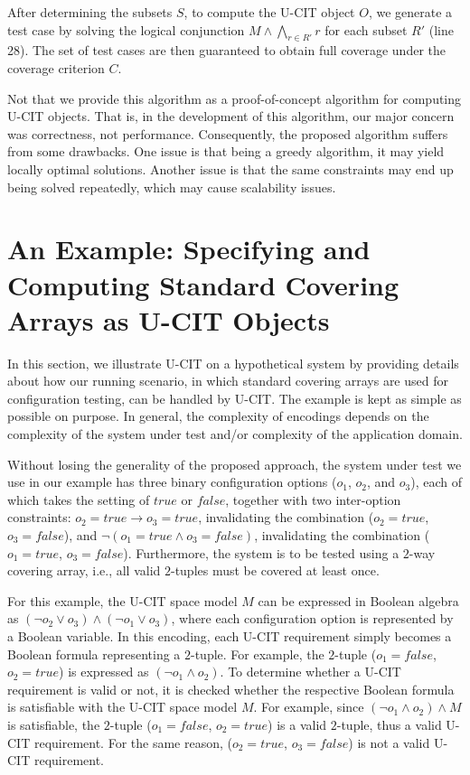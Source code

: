 \documentclass[EPiC]{easychair}
\begin{document}
After determining the subsets $S$, to compute the U-CIT object $O$, we generate a test case by solving the logical conjunction $M \wedge \bigwedge_{r \in R'}r$ for each subset $R'$ (line 28). The set of test cases are then guaranteed to obtain full coverage under the coverage criterion $C$.

Not that we provide this algorithm as a proof-of-concept algorithm for computing U-CIT objects. That is, in the development of this algorithm, our major concern was correctness, not performance. Consequently, the proposed algorithm suffers from some drawbacks. One issue is that being a greedy algorithm, it may yield locally optimal solutions. Another issue is that the same constraints may end up being solved repeatedly, which may cause scalability issues.

\section{An Example: Specifying and Computing Standard Covering Arrays as U-CIT Objects} \label{exampleTCA}

In this section, we illustrate U-CIT on a hypothetical system  by providing details about how our running scenario, in which standard covering arrays are used for configuration testing, can be handled by U-CIT. The example is kept as simple as possible on purpose. In general, the complexity of encodings depends on the complexity of the system under test and/or complexity of the application domain.

Without losing the generality of the proposed approach, the system under test we use in our example has three binary configuration options ($o_1$, $o_2$, and $o_3$), each of which takes the setting of $true$ or $false$, together with two inter-option constraints: $o_2=true \rightarrow o_3=true$, invalidating the combination ($o_2=true$, $o_3=false$), and $\neg (o_1=true \wedge o_3=false)$, invalidating the combination ($o_1=true$, $o_3=false$). Furthermore, the system is to be tested using a $2$-way covering array, i.e., all valid $2$-tuples must be covered at least once. 

For this example, the U-CIT space model $M$ can be  expressed in Boolean algebra as $(\neg o_2 \vee o_3) \wedge (\neg o_1 \vee o_3)$, where each configuration option is represented by a Boolean variable. In this encoding, each U-CIT requirement simply becomes a Boolean formula representing a $2$-tuple. For example, the $2$-tuple ($o_1=false$, $o_2=true$) is expressed as $(\neg o_1 \wedge o_2)$. To determine whether a U-CIT requirement is valid or not, it is checked whether the respective Boolean formula is satisfiable with the U-CIT space model $M$. For example, since $(\neg o_1 \wedge o_2) \wedge M$ is satisfiable, the $2$-tuple ($o_1=false$, $o_2=true$) is a valid $2$-tuple, thus a valid U-CIT  requirement. For the same reason, ($o_2=true$, $o_3=false$) is not a valid U-CIT requirement. 
\end{document}
